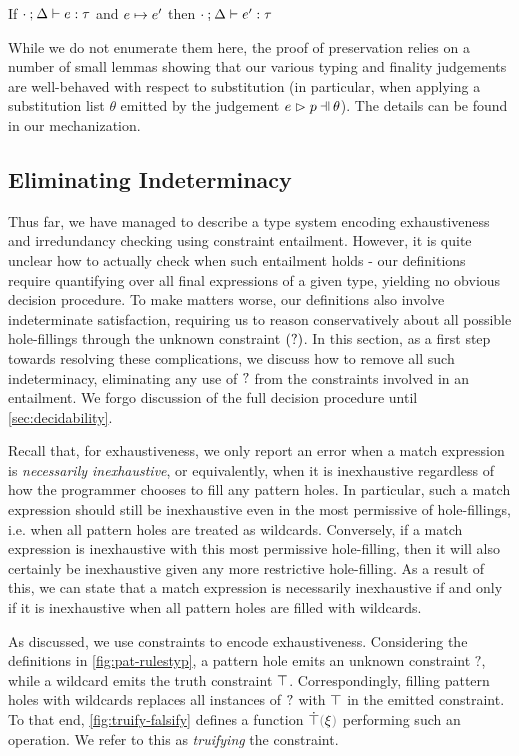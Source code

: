 \begin{theorem}[Preservation]
	\label{theorem:preservation}
	If $\cdot \mathbin{;} \Delta \vdash e : \tau$ and $e \mapsto e'$
	then $\cdot \mathbin{;} \Delta \vdash e' : \tau$
\end{theorem}
While we do not enumerate them here, the proof of preservation relies on a number of small lemmas showing that our various typing and finality judgements are well-behaved with respect to substitution (in particular, when applying a substitution list $\theta$ emitted by the judgement $\hpatmatch{e}{p}{\theta}$). The details can be found in our mechanization.

\subsection{Eliminating Indeterminacy}\label{sec:analyses}
Thus far, we have managed to describe a type system encoding exhaustiveness and irredundancy checking using constraint entailment. However, it is quite unclear how to actually check when such entailment holds - our definitions require quantifying over all final expressions of a given type, yielding no obvious decision procedure. To make matters worse, our definitions also involve indeterminate satisfaction, requiring us to reason conservatively about all possible hole-fillings through the unknown constraint $(\mathtt{?})$. In this section, as a first step towards resolving these complications, we discuss how to remove all such indeterminacy, eliminating any use of $\mathtt{?}$ from the constraints involved in an entailment. We forgo discussion of the full decision procedure until \autoref{sec:decidability}.

Recall that, for exhaustiveness, we only report an error when a  match expression is \emph{necessarily inexhaustive}, or equivalently, when it is inexhaustive regardless of how the programmer chooses to fill any pattern holes. In particular, such a match expression should still be inexhaustive even in the most permissive of hole-fillings, i.e. when all pattern holes are treated as wildcards. Conversely, if a match expression is inexhaustive with this most permissive hole-filling, then it will also certainly be inexhaustive given any more restrictive hole-filling. As a result of this, we can state that a match expression is necessarily inexhaustive if and only if it is inexhaustive when all pattern holes are filled with wildcards. 

As discussed, we use constraints to encode exhaustiveness. Considering the definitions in \autoref{fig:pat-rulestyp}, a pattern hole emits an unknown constraint $?$, while a wildcard emits the truth constraint $\top$. Correspondingly, filling pattern holes with wildcards replaces all instances of $\mathtt{?}$ with $\top$ in the emitted constraint. To that end, \autoref{fig:truify-falsify} defines a function $\ctruify{\xi}$ performing such an operation. We refer to this as \emph{truifying} the constraint. 

